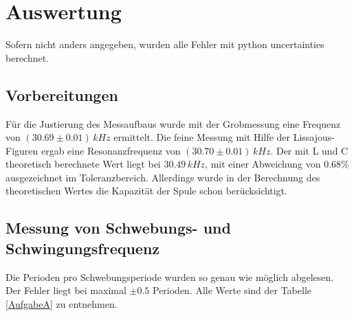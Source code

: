 \documentclass[11pt,ngerman,a4paper]{article}
\begin{document}
\section{Auswertung}


Sofern nicht anders angegeben, wurden alle Fehler mit python uncertainties berechnet.
\subsection{Vorbereitungen}
Für die Justierung des Messaufbaus wurde mit der Grobmessung eine Frequenz von $(30.69\pm0.01)\,kHz$ ermittelt. Die feine Messung mit Hilfe der Lissajous-Figuren ergab eine Resonanzfrequenz von $(30.70\pm0.01) \, kHz$. Der mit L und C theoretisch berechnete Wert liegt bei $30.49 \, kHz$, mit einer Abweichung von $0.68 \%$ ausgezeichnet im Toleranzbereich. Allerdings wurde in der Berechnung des theoretischen Wertes die Kapazität der Spule schon berücksichtigt.
\subsection{Messung von Schwebungs- und Schwingungsfrequenz}
Die Perioden pro Schwebungsperiode wurden so genau wie möglich abgelesen. Der Fehler liegt bei maximal $\pm 0.5$ Perioden. Alle Werte sind der Tabelle \ref{AufgabeA} zu entnehmen.
\end{document}
